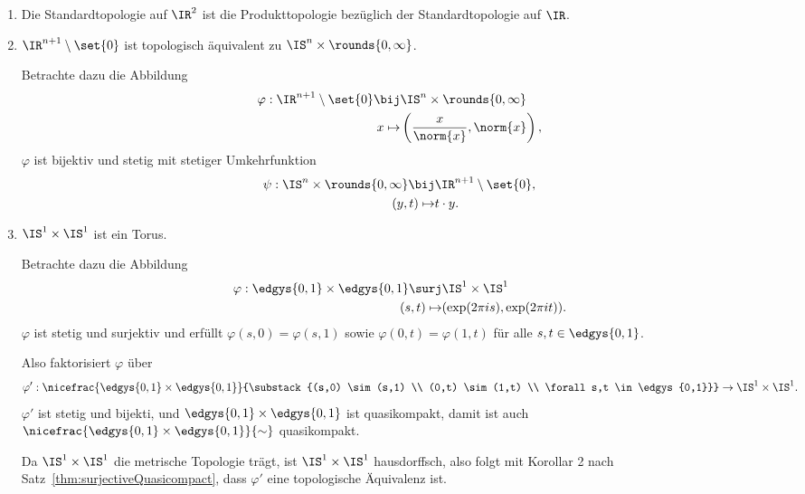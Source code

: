 \documentclass[language=ngerman]{TemplateLecture} %
\begin{document}
\begin{example}\leavevmode
    \begin{enumerate}[$(i)$]
        \item Die Standardtopologie auf $\IR^2$ ist die Produkttopologie bezüglich der Standardtopologie auf $\IR$.
        \item $\IR^{n+1} \setminus \set{0}$ ist topologisch äquivalent zu $\IS^n \times \rounds{0,\infty}$.

        Betrachte dazu die Abbildung 
        \begin{align*}
            \varphi: \IR^{n+1} \setminus \set{0} \bij& \IS^n \times \rounds{0,\infty} \\
            x \mapsto& \left(\frac{x}{\norm{x}},\norm{x}\right),
        \end{align*}
        $\varphi$ ist bijektiv und stetig mit stetiger Umkehrfunktion
        \begin{align*}
            \psi: \IS^n \times \rounds{0,\infty} \bij& \IR^{n+1} \setminus \set{0}, \\
            (y,t) \mapsto& t \cdot y.
        \end{align*}
        \item $\IS^1 \times \IS^1$ ist ein Torus.
        
        Betrachte dazu die Abbildung 
        \begin{align*}
            \varphi: \edgys{0,1} \times \edgys{0,1} \surj& \IS^1 \times \IS^1 \\
            (s,t) \mapsto& (\exp(2\pi is), \exp(2\pi it)).
        \end{align*}
        $\varphi$ ist stetig und surjektiv und erfüllt $\varphi(s,0) = \varphi(s,1)$ sowie $\varphi(0,t) = \varphi(1,t)$ für alle $s,t \in \edgys{0,1}$.

        Also faktorisiert $\varphi$ über 
        \begin{equation*}
            \varphi' : \nicefrac{\edgys{0,1} \times \edgys{0,1}}{\substack{(s,0) \sim (s,1) \\ (0,t) \sim (1,t) \\ \forall s,t \in \edgys{0,1}}} \to \IS^1 \times \IS^1.
        \end{equation*}
        $\varphi'$ ist stetig und bijekti, und $\edgys{0,1} \times \edgys{0,1}$ ist quasikompakt, damit ist auch $\nicefrac{\edgys{0,1} \times \edgys{0,1}}{\sim}$ quasikompakt.

        Da $\IS^1 \times \IS^1$ die metrische Topologie trägt, ist $\IS^1 \times \IS^1$ hausdorffsch, also folgt mit Korollar 2 nach Satz~\ref{thm:surjectiveQuasicompact}, dass $\varphi'$ eine topologische Äquivalenz ist.
    \end{enumerate}
\end{example}
\end{document}
